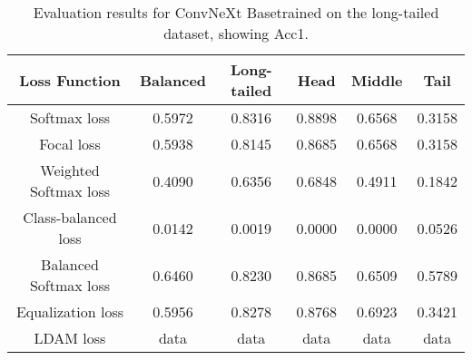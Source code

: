 \begin{table}[h!]
    \centering
    \begin{tabular}{cccccc}
        \toprule
        Loss Function & Balanced & Long-tailed & Head & Middle & Tail \\ 
        \midrule
        Softmax loss   & 0.5972 & 0.8316 & 0.8898 & 0.6568 & 0.3158 \\
        Focal loss   & 0.5938 & 0.8145 & 0.8685 & 0.6568 & 0.3158 \\
        Weighted Softmax loss   & 0.4090 & 0.6356 & 0.6848 & 0.4911 & 0.1842 \\
        Class-balanced loss   & 0.0142 & 0.0019 & 0.0000 & 0.0000 & 0.0526 \\
        Balanced Softmax loss   & 0.6460 & 0.8230 & 0.8685 & 0.6509 & 0.5789 \\
        Equalization loss   & 0.5956 & 0.8278 & 0.8768 & 0.6923 & 0.3421 \\
        LDAM loss   & data & data & data & data & data \\
        \bottomrule
    \end{tabular}
    \caption{Evaluation results for ConvNeXt Basetrained on the long-tailed dataset, showing Acc1.}
    \label{tab:conv_lt_acc1}
\end{table}

